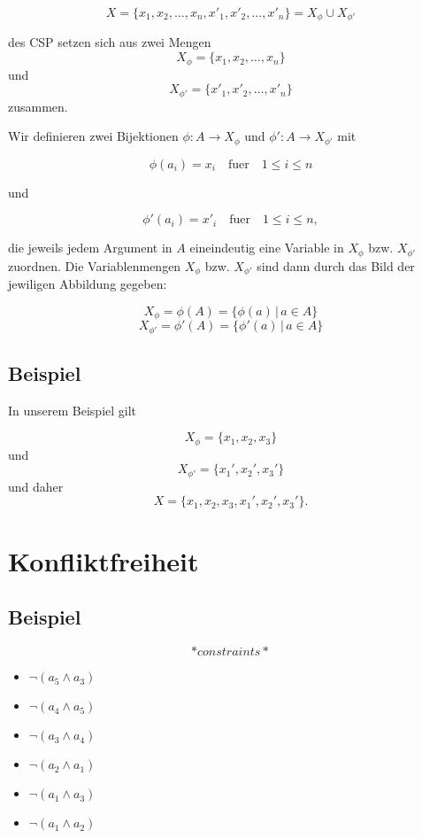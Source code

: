 \[ X  = \{x_1,x_2,\dots,x_n,x'_1,x'_2,\dots,x'_n\} = X_{\phi} \cup X_{\phi'} \]

des CSP setzen sich aus zwei Mengen \[X_{\phi} = \{x_1,x_2,\dots,x_n\}
\] und \[X_{\phi'} = \{x'_1,x'_2,\dots,x'_n\} \] zusammen.

Wir definieren zwei Bijektionen $\phi \colon A \to X_{\phi}$ und
$\phi' \colon A \to X_{\phi'}$ mit

\[ \phi(a_i) = x_i \quad \text{fuer} \quad 1 \leq i \leq  n \]

und

\[ \phi'(a_i) = x'_i \quad \text{fuer} \quad 1 \leq i \leq  n,\]

die jeweils jedem Argument in $A$ eineindeutig eine Variable in
$X_{\phi}$ bzw. $X_{\phi'}$ zuordnen. Die Variablenmengen $X_{\phi}$
bzw. $X_{\phi'}$ sind dann durch das Bild der jewiligen Abbildung
gegeben:

\[ X_{\phi}  = \phi(A) = \{ \phi(a) \,|\, a \in A \} \]
\[ X_{\phi'}  = \phi'(A) = \{ \phi'(a) \,|\, a \in A \} \]

\subsection{Beispiel}\label{beispiel-1}

In unserem Beispiel gilt

\[ X_{\phi} = \{x_1,x_2,x_3\} \] und \[ X_{\phi'} = \{x_1',x_2',x_3'\}\]
und daher \[ X = \{x_1,x_2,x_3,x_1',x_2',x_3'\}.\]

\section{Konfliktfreiheit}\label{konfliktfreiheit}

\subsection{Beispiel}\label{beispiel-2}

\[*constraints*\]

\begin{itemize}
\itemsep1pt\parskip0pt
\item
  $\lnot ( a_5 \land a_3 ) $
\item
  $\lnot ( a_4 \land a_5 ) $
\item
  $\lnot ( a_3 \land a_4 ) $
\item
  $\lnot ( a_2 \land a_1 ) $
\item
  $\lnot ( a_1 \land a_3 ) $
\item
  $\lnot ( a_1 \land a_2 ) $
\end{itemize}
